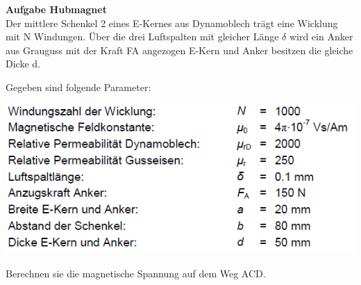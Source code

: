 		\iend
\newpage
		\beginbsp
 		\textbf{Aufgabe Hubmagnet} \\
		Der mittlere Schenkel 2 eines E-Kernes aus Dynamoblech trägt eine Wicklung mit N Windungen. Über
		die drei Luftspalten mit gleicher Länge $\delta$ wird ein Anker aus Grauguss mit der Kraft FA angezogen
		E-Kern und Anker besitzen die gleiche Dicke d. \\
		\begin{center}
		\end{center}
		Gegeben sind folgende Parameter: \\

		\begin{center}
	\includegraphics[scale=0.6]{img/ex5-3.png}
		\end{center}
		Berechnen sie die magnetische Spannung auf dem Weg ACD.
		\iend

